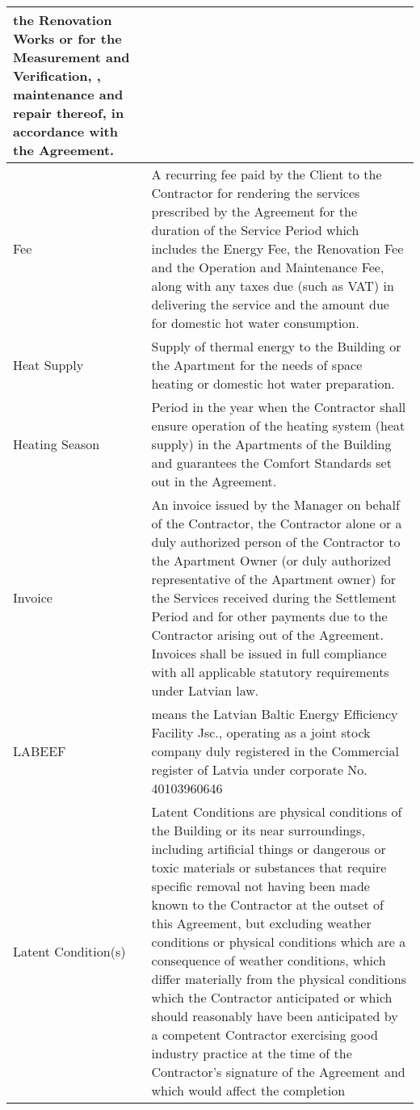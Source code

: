\begin{center}
\begin{longtabu}{|X|X[3]|}
		     the Renovation Works or for the Measurement and Verification, , maintenance and
		     repair thereof, in accordance with the Agreement.  \\ \hline{}
	Fee & A recurring fee paid by the Client to the Contractor for
	      rendering the services prescribed by the Agreement for the duration of the
	      Service Period which includes the Energy Fee, the Renovation Fee and the
	      Operation and Maintenance Fee, along with any taxes due (such as VAT) in
	      delivering the service and the amount due for domestic hot water consumption. \\ \hline{}
	Heat Supply & Supply of thermal energy to the Building or the Apartment for the needs of space heating or domestic hot water preparation. \\ \hline{}
	Heating Season & Period in the year when the Contractor shall ensure
			 operation of the heating system (heat supply) in the Apartments of the Building
			 and guarantees the Comfort Standards set out in the Agreement. \\ \hline{}
	Invoice & An invoice issued by the Manager on behalf of the Contractor,
		  the Contractor alone or a duly authorized person of the Contractor to the
		  Apartment Owner (or duly authorized representative of the Apartment owner) for
		  the Services received during the Settlement Period and for other payments due
		  to the Contractor arising out of the Agreement. Invoices shall be issued in
		  full compliance with all applicable statutory requirements under Latvian law. \\ \hline{}
	LABEEF & means the Latvian Baltic Energy Efficiency Facility Jsc.,
		 operating as a joint stock company duly registered in the Commercial
		 register of Latvia under corporate No. 40103960646 \\ \hline{}
	Latent Condition(s) & Latent Conditions are physical conditions of the
			      Building or its near surroundings, including artificial things or dangerous or
			      toxic materials or substances that require specific removal not having been
			      made known to the Contractor at the outset of this Agreement, but excluding
			      weather conditions or physical conditions which are a consequence of weather
			      conditions, which differ materially from the physical conditions which the
			      Contractor anticipated or which should reasonably have been anticipated by a
	   		      competent Contractor exercising good industry practice at the time of the
			      Contractor’s signature of the Agreement and which would affect the completion

\end{longtabu}
\end{center}
